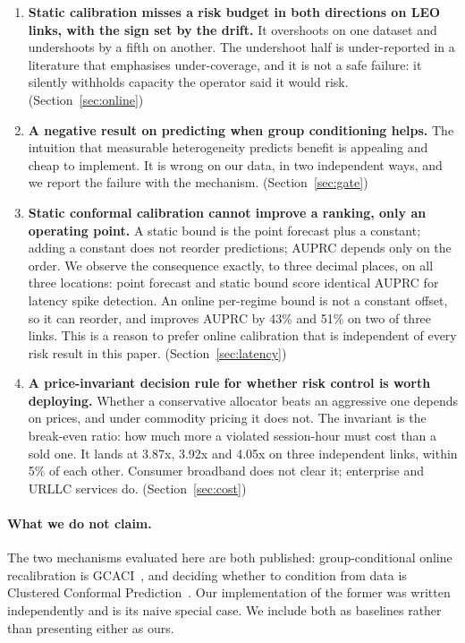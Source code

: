 \documentclass[acmsmall,screen]{acmart}
\begin{document}
\begin{enumerate}
\item \textbf{Static calibration misses a risk budget in both directions on LEO links, with the sign set by the drift.} It overshoots on one dataset and undershoots by a fifth on another. The undershoot half is under-reported in a literature that emphasises under-coverage, and it is not a safe failure: it silently withholds capacity the operator said it would risk. (Section~\ref{sec:online})

\item \textbf{A negative result on predicting when group conditioning helps.} The intuition that measurable heterogeneity predicts benefit is appealing and cheap to implement. It is wrong on our data, in two independent ways, and we report the failure with the mechanism. (Section~\ref{sec:gate})

\item \textbf{Static conformal calibration cannot improve a ranking, only an operating point.} A static bound is the point forecast plus a constant; adding a constant does not reorder predictions; AUPRC depends only on the order. We observe the consequence exactly, to three decimal places, on all three locations: point forecast and static bound score identical AUPRC for latency spike detection. An online per-regime bound is not a constant offset, so it can reorder, and improves AUPRC by 43\% and 51\% on two of three links. This is a reason to prefer online calibration that is independent of every risk result in this paper. (Section~\ref{sec:latency})

\item \textbf{A price-invariant decision rule for whether risk control is worth deploying.} Whether a conservative allocator beats an aggressive one depends on prices, and under commodity pricing it does not. The invariant is the break-even ratio: how much more a violated session-hour must cost than a sold one. It lands at 3.87x, 3.92x and 4.05x on three independent links, within 5\% of each other. Consumer broadband does not clear it; enterprise and URLLC services do. (Section~\ref{sec:cost})
\end{enumerate}

\paragraph{What we do not claim.} The two mechanisms evaluated here are both published: group-conditional online recalibration is GCACI~\cite{ramalingam2025noregret}, and deciding whether to condition from data is Clustered Conformal Prediction~\cite{ding2023clustered}. Our implementation of the former was written independently and is its naive special case. We include both as baselines rather than presenting either as ours.
\end{document}
